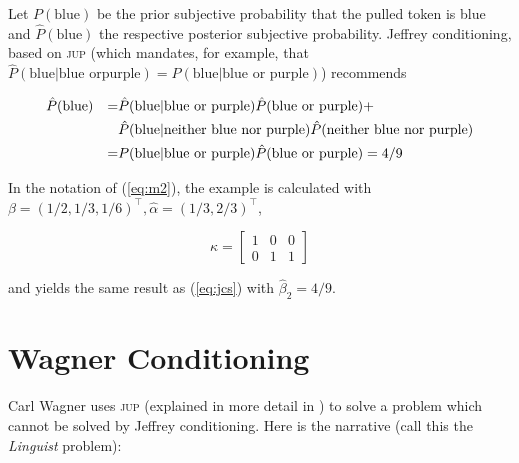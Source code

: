 {\noindent}Let $P(\mbox{blue})$ be the prior subjective probability
that the pulled token is blue and $\hat{P}(\mbox{blue})$ the
respective posterior subjective probability. Jeffrey conditioning,
based on \textsc{jup} (which mandates, for example, that
$\hat{P}(\mbox{blue}|\mbox{blue or}\mbox{
  purple})=P(\mbox{blue}|\mbox{blue or purple})$) recommends

\begin{align}
  \label{eq:jcs}
&\hat{P}(\mbox{blue})&=&\hat{P}(\mbox{blue}|\mbox{blue or purple})\hat{P}(\mbox{blue or
  purple})+\notag \\
&&&\hat{P}(\mbox{blue}|\mbox{neither blue nor
  purple})\hat{P}(\mbox{neither blue nor purple})\notag \\
&&=&P(\mbox{blue}|\mbox{blue or purple})\hat{P}(\mbox{blue or
  purple})=4/9
\end{align}

{\noindent}In the notation of (\ref{eq:m2}), the example is calculated
with $\beta=(1/2,1/3,1/6)^{\top},\hat{\alpha}=(1/3,2/3)^{\top}$,

\begin{equation}
  \label{eq:kappa}
  \kappa=\left[
  \begin{array}{ccc}
    1 & 0 & 0 \\
    0 & 1 & 1
  \end{array}\right]
\end{equation}

{\noindent}and yields the same result as (\ref{eq:jcs}) with
$\hat{\beta}_{2}=4/9$.

\section{Wagner Conditioning}
\label{wc}

Carl Wagner uses \textsc{jup} (explained in more detail in
) to solve a problem which cannot be solved by
Jeffrey conditioning. Here is the narrative (call this the
\emph{Linguist} problem):

